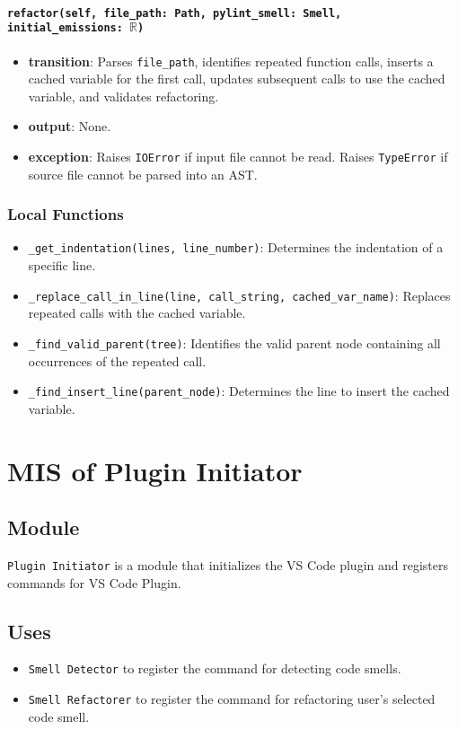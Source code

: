 \documentclass[12pt, titlepage]{article}
\begin{document}
\paragraph{\texttt{refactor(self, file\_path: Path, pylint\_smell: Smell, initial\_emissions: $\mathbb{R}$)}}
\begin{itemize}
  \item \textbf{transition}: Parses \texttt{file\_path}, identifies repeated function calls, inserts a cached variable for the first call, updates subsequent calls to use the cached variable, and validates refactoring.
  \item \textbf{output}: None.
  \item \textbf{exception}: Raises \texttt{IOError} if input file cannot be read. Raises \texttt{TypeError} if source file cannot be parsed into an AST.
\end{itemize}

\subsubsection{Local Functions}
\begin{itemize}
  \item \texttt{\_get\_indentation(lines, line\_number)}: Determines the indentation of a specific line.
  \item \texttt{\_replace\_call\_in\_line(line, call\_string, cached\_var\_name)}: Replaces repeated calls with the cached variable.
  \item \texttt{\_find\_valid\_parent(tree)}: Identifies the valid parent node containing all occurrences of the repeated call.
  \item \texttt{\_find\_insert\_line(parent\_node)}: Determines the line to insert the cached variable.
\end{itemize}

\newpage

\section{MIS of Plugin Initiator}

\subsection{Module}
\texttt{Plugin Initiator} is a module that initializes the VS Code plugin and registers commands for VS Code Plugin.

\subsection{Uses}
\begin{itemize}
    \item \texttt{Smell Detector} to register the command for detecting code smells.
    \item \texttt{Smell Refactorer} to register the command for refactoring user's selected code smell.
\end{itemize}
\end{document}
